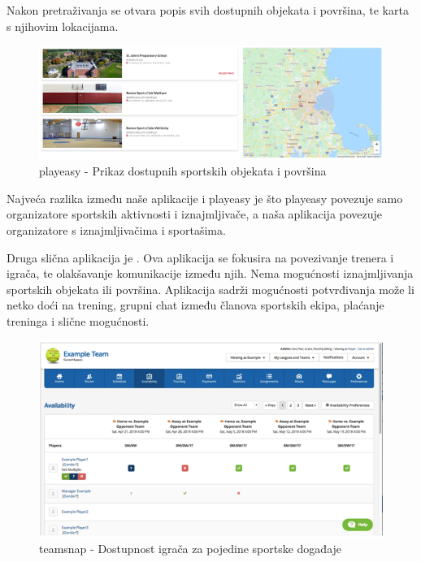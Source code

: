 		Nakon pretraživanja se otvara popis svih dostupnih objekata i površina, te karta s njihovim lokacijama.
		
		\begin{figure}[H]
			\includegraphics[width=1\linewidth]{slike/playeasy-prikaz.PNG}
			\centering
			\caption{playeasy - Prikaz dostupnih sportskih objekata i površina}
			\label{fig:promjene}
		\end{figure}
		
		Najveća razlika između naše aplikacije i playeasy je što playeasy povezuje samo organizatore sportskih aktivnosti i iznajmljivače, a naša aplikacija povezuje organizatore s iznajmljivačima i sportašima.
		
		Druga slična aplikacija je
		. Ova aplikacija se fokusira na povezivanje trenera i igrača, te olakšavanje komunikacije između njih. Nema mogućnosti iznajmljivanja sportskih objekata ili površina. Aplikacija sadrži mogućnosti potvrđivanja može li netko doći na trening, grupni chat između članova sportskih ekipa, plaćanje treninga i slične mogućnosti.
		
		\begin{figure}[H]
			\includegraphics[width=1\linewidth]{slike/teamsnap-dostup.PNG}
			\centering
			\caption{teamsnap - Dostupnost igrača za pojedine sportske događaje}
			\label{fig:promjene}
		\end{figure}
		
